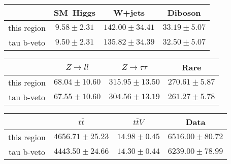 \centering
\begin{tabular}{|c|c|c|c|} \hline
 & SM~Higgs & W+jets & Diboson\\\hline
this region & $9.58\pm2.31$ & $142.00\pm34.41$ & $33.19\pm5.07$\\\hline
tau b-veto & $9.50\pm2.31$ & $135.82\pm34.39$ & $32.50\pm5.07$\\\hline
\end{tabular}
\begin{tabular}{|c|c|c|c|} \hline
 & $Z\to ll$ & $Z\to \tau\tau$ & Rare\\\hline
this region & $68.04\pm10.60$ & $315.95\pm13.50$ & $270.61\pm5.87$\\\hline
tau b-veto & $67.55\pm10.60$ & $304.56\pm13.19$ & $261.27\pm5.78$\\\hline
\end{tabular}
\begin{tabular}{|c|c|c|c|} \hline
 & $t\bar{t}$ & $t\bar{t}V$ & Data\\\hline
this region & $4656.71\pm25.23$ & $14.98\pm0.45$ & $6516.00\pm80.72$\\\hline
tau b-veto & $4443.50\pm24.66$ & $14.30\pm0.44$ & $6239.00\pm78.99$\\\hline
\end{tabular}

